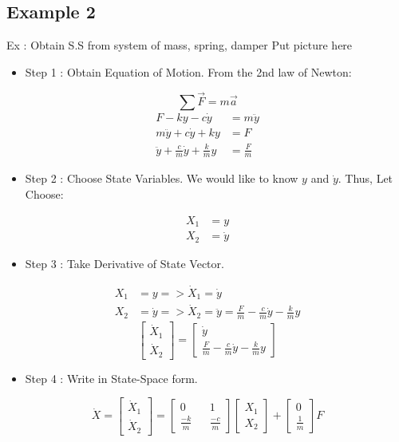 \documentclass[12pt,a4paper]{article}
\begin{document}
	\subsection{Example 2}
	Ex : Obtain S.S from system of mass, spring, damper
	Put picture here
	\begin{itemize}
		\item Step 1 : Obtain Equation of Motion. From the 2nd law of Newton:
	\end{itemize}
	\[
	\sum \vec{F} = m\vec{a}
	\]
	\[
	\begin{split}
		F - ky - c \dot{y} &= m \ddot{y} \\
		m \ddot{y} + c \dot{y} + ky &= F \\
		\ddot{y} + \frac{c}{m} \dot{y} + \frac{k}{m} y &= \frac{F}{m}
	\end{split}
	\]
	\begin{itemize}
		\item Step 2 : Choose State Variables. We would like to know \(y\) and \(\dot{y}\). Thus, Let Choose:
	\end{itemize}
	\[
	\begin{split}
		X_1 &= y \\
		X_2 &= \dot{y}
	\end{split}
	\]
	\begin{itemize}
		\item Step 3 : Take Derivative of State Vector.
	\end{itemize}
	\[
	\begin{split}
		X_1 &= y => \dot{X}_1 = \dot{y}\\
		X_2 &= \dot{y} => \dot{X}_2 = \ddot{y} = \frac{F}{m} - \frac{c}{m} \dot{y} - \frac{k}{m} y
	\end{split}
	\]
	\[
	\begin{bmatrix}
		\dot{X}_1 \\
		\dot{X}_2 
	\end{bmatrix} =
	\begin{bmatrix}
		\dot{y}                                           \\
		\frac{F}{m} - \frac{c}{m} \dot{y} - \frac{k}{m} y 
	\end{bmatrix}
	\]
	\begin{itemize}
		\item Step 4 : Write in State-Space form.
	\end{itemize}
	\[
	\dot{X} = 
	\begin{bmatrix}
		\dot{X}_1 \\
		\dot{X}_2 
	\end{bmatrix} =
	\begin{bmatrix}
		0            &   & 1            \\
		\frac{-k}{m} &   & \frac{-c}{m} 
	\end{bmatrix}
	\begin{bmatrix}
		X_1 \\
		X_2 
	\end{bmatrix} +
	\begin{bmatrix}
		0           \\
		\frac{1}{m} 
	\end{bmatrix} F
	\]
\end{document}
